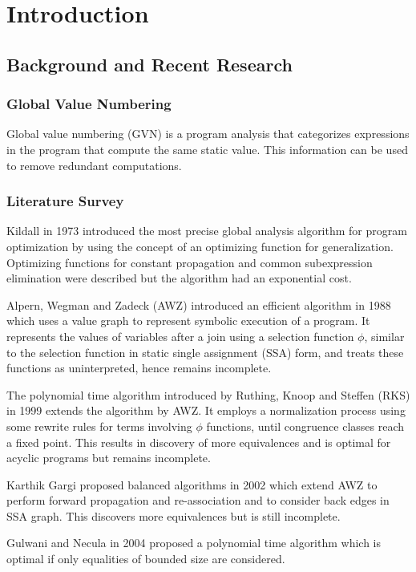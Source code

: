 \chapter{Introduction}

\section{Background and Recent Research}
\subsection{Global Value Numbering}
Global value numbering (GVN) is a program analysis that categorizes expressions in the program that compute the same static value\cite{vandrunen}. This information can be used to remove redundant computations.


\subsection{Literature Survey}
Kildall in 1973\cite{kildall} introduced the most precise global analysis algorithm for program optimization by using the concept of an optimizing function for generalization. Optimizing functions for constant propagation and common subexpression elimination were described but the algorithm had an exponential cost.

Alpern, Wegman and Zadeck (AWZ) introduced an efficient algorithm in 1988\cite{awz} which uses a value graph to represent symbolic execution of a program. It represents the values of variables after a join using a selection function $\phi$, similar to the selection function in static single assignment (SSA) form, and treats these functions as uninterpreted, hence remains incomplete.

The polynomial time algorithm introduced by Ruthing, Knoop and Steffen (RKS) in 1999\cite{ruthing} extends the algorithm by AWZ. It employs a normalization process using some rewrite rules for terms involving $\phi$ functions, until congruence classes reach a fixed point. This results in discovery of more equivalences and is optimal for acyclic programs but remains incomplete.

Karthik Gargi proposed balanced algorithms in 2002\cite{gargi} which extend AWZ to perform forward propagation and re-association and to consider back edges in SSA graph. This discovers more equivalences but is still incomplete.

Gulwani and Necula in 2004\cite{gulwani} proposed a polynomial time algorithm which is optimal if only equalities of bounded size are considered.

